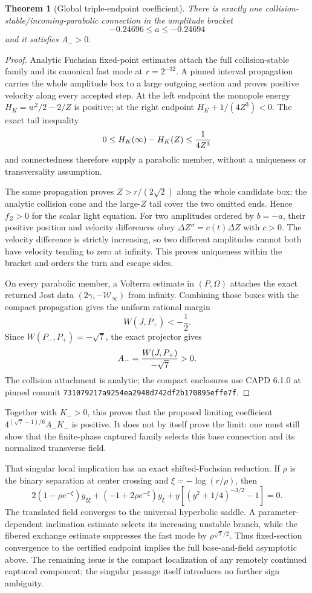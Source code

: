 \documentclass[11pt]{article}
\newtheorem{theorem}{Theorem}
\begin{document}
\begin{theorem}[Global triple-endpoint coefficient]
There is exactly one collision-stable/incoming-parabolic connection in the amplitude bracket
\[
 -0.24696\le a\le-0.24694
\]
and it satisfies $A_->0$.
\end{theorem}
\begin{proof}
Analytic Fuchsian fixed-point estimates attach the full collision-stable
family and its canonical fast mode at $r=2^{-32}$. A pinned interval
propagation carries the whole amplitude box to a large outgoing section and
proves positive velocity along every accepted step. At the left endpoint the
monopole energy $H_K=w^2/2-2/Z$ is positive; at the right endpoint
$H_K+1/(4Z^3)<0$. The exact tail inequality
\[
 0\le H_K(\infty)-H_K(Z)\le {1\over4Z^3}
\]
and connectedness therefore supply a parabolic member, without a uniqueness
or transversality assumption.

The same propagation proves $Z>r/(2\sqrt2)$ along the whole candidate box;
the analytic collision cone and the large-$Z$ tail cover the two omitted
ends. Hence $f_Z>0$ for the scalar light equation. For two amplitudes ordered
by $b=-a$, their positive position and velocity differences obey
$\Delta Z''=c(t)\Delta Z$ with $c>0$. The velocity difference is strictly
increasing, so two different amplitudes cannot both have velocity tending to
zero at infinity. This proves uniqueness within the bracket and orders the
turn and escape sides.

On every parabolic member, a Volterra estimate in $(P,\Omega)$ attaches the
exact returned Jost data
$(2\gamma,-\mathcal W_\infty)$ from infinity. Combining those boxes with the
compact propagation gives the uniform rational margin
\[
 W(J,P_+)<-\frac12.
\]
Since $W(P_-,P_+)=-\sqrt7$, the exact projector gives
\[
 A_-={W(J,P_+)\over-\sqrt7}>0.
\]
The collision attachment is analytic; the compact enclosures use CAPD 6.1.0
at pinned commit \texttt{731079217a9254ea2948d742df2b170895effe7f}.
\end{proof}

Together with $K_->0$, this proves that the proposed limiting coefficient
$4^{(\sqrt7-1)/6}A_-K_-$ is positive. It does not by itself prove the limit:
one must still show that the finite-phase captured family selects this base
connection and its normalized transverse field.

That singular local implication has an exact shifted-Fuchsian reduction. If
$\rho$ is the binary separation at center crossing and
$\xi=-\log(r/\rho)$, then
\[
 2(1-\rho e^{-\xi})y_{\xi\xi}
 +(-1+2\rho e^{-\xi})y_\xi
 +y[(y^2+1/4)^{-3/2}-1]=0.
\]
The translated field converges to the universal hyperbolic saddle. A
parameter-dependent inclination estimate selects its increasing unstable
branch, while the fibered exchange estimate suppresses the fast mode by
$\rho^{\sqrt7/2}$. Thus fixed-section convergence to the certified endpoint
implies the full base-and-field asymptotic above. The remaining issue is the
compact localization of any remotely continued captured component; the
singular passage itself introduces no further sign ambiguity.
\end{document}
